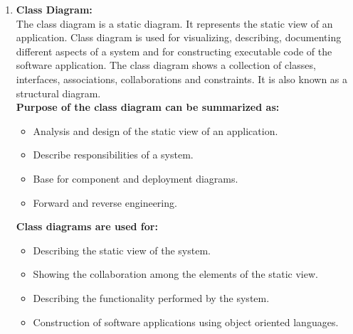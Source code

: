 \documentclass[12pt]{extreport}
\begin{document}
\begin{enumerate}
\item \textbf{Class Diagram:}\\
The class diagram is a static diagram. It represents the static view of an application. Class diagram is used for visualizing, describing, documenting different aspects of a system and for constructing executable code of the software application. The class diagram shows a collection of classes, interfaces, associations, collaborations and constraints. It is also known as a structural diagram.\\
\newline
\textbf{Purpose of the class diagram can be summarized as:}
\begin{itemize}
	\item Analysis and design of the static view of an application.
	\item Describe responsibilities of a system.
	\item Base for component and deployment diagrams.
	\item Forward and reverse engineering.
\end{itemize}

\textbf{Class diagrams are used for:}
 \begin{itemize}
	\item Describing the static view of the system.
	\item Showing the collaboration among the elements of the static view.
	\item Describing the functionality performed by the system.
	\item Construction of software applications using object oriented languages.
\end{itemize}

\end{enumerate}

\pagebreak
\end{document}
